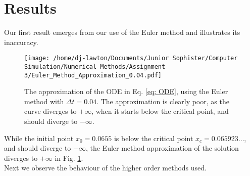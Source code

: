 \documentclass{article}
\theoremstyle{definition}
\theoremstyle{remark}
\begin{document}
\section{Results}
Our first result emerges from our use of the Euler method and illustrates its inaccuracy.
\begin{figure}[H]
    \centering
    \texttt{[image: /home/dj-lawton/Documents/Junior Sophister/Computer Simulation/Numerical Methods/Assignment 3/Euler\_Method\_Approximation\_0.04.pdf]}
    \caption{\label{fig: Euler method 0.04} The approximation of the ODE in Eq. \ref{eq: ODE}, using the Euler method with $\Delta t = 0.04$. The approximation is clearly poor, as the curve diverges to $+\infty$, when it starts below the critical point, and should diverge to $-\infty$.}
\end{figure}
While the initial point $x_0=0.0655$ is below the critical point $x_c=0.065923\dots$, and should diverge to $-\infty$, the Euler method approximation of the solution diverges to $+\infty$ in Fig. \ref{fig: Euler method 0.04}.\\
\indent Next we observe the behaviour of the higher order methods used. 
\end{document}
